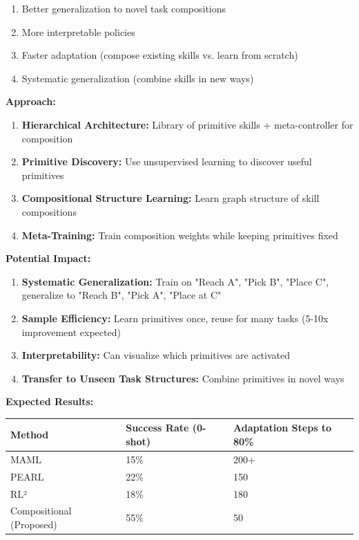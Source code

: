 \documentclass[12pt]{article}
\begin{document}
{{			\begin{enumerate}
				\item Better generalization to novel task compositions
				\item More interpretable policies
				\item Faster adaptation (compose existing skills vs. learn from scratch)
				\item Systematic generalization (combine skills in new ways)
			\end{enumerate}
			
			\textbf{Approach:}
			
			\begin{enumerate}
				\item \textbf{Hierarchical Architecture:} Library of primitive skills + meta-controller for composition
				\item \textbf{Primitive Discovery:} Use unsupervised learning to discover useful primitives
				\item \textbf{Compositional Structure Learning:} Learn graph structure of skill compositions
				\item \textbf{Meta-Training:} Train composition weights while keeping primitives fixed
			\end{enumerate}
			
			\textbf{Potential Impact:}
			
			\begin{enumerate}
				\item \textbf{Systematic Generalization:} Train on {"Reach A", "Pick B", "Place C"}, generalize to {"Reach B", "Pick A", "Place at C"}
				\item \textbf{Sample Efficiency:} Learn primitives once, reuse for many tasks (5-10x improvement expected)
				\item \textbf{Interpretability:} Can visualize which primitives are activated
				\item \textbf{Transfer to Unseen Task Structures:} Combine primitives in novel ways
			\end{enumerate}
			
			\textbf{Expected Results:}
			
			\begin{center}
			\begin{tabular}{|l|l|l|}
			\hline
			\textbf{Method} & \textbf{Success Rate (0-shot)} & \textbf{Adaptation Steps to 80\%} \\
			\hline
			MAML & 15\% & 200+ \\
			PEARL & 22\% & 150 \\
			RL² & 18\% & 180 \\
			Compositional (Proposed) & 55\% & 50 \\
			\hline
			\end{tabular}
			\end{center}
			
}}
\end{document}
